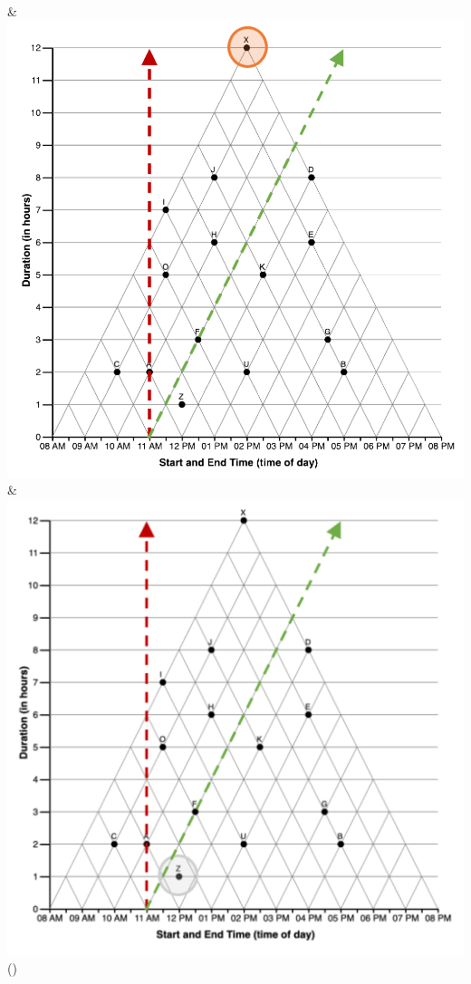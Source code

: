 \documentclass[
  letterpaper,
  DIV=11,
  numbers=noendperiod]{scrreprt}
\begin{document}
\begin{longtable}[]
& \includegraphics{analysis/SGC3A/static/interpretations/Q1_111_X.png} &
\includegraphics{analysis/SGC3A/static/interpretations/Q1_111_Z.png} \\
\bottomrule()
\end{longtable}
\end{document}

